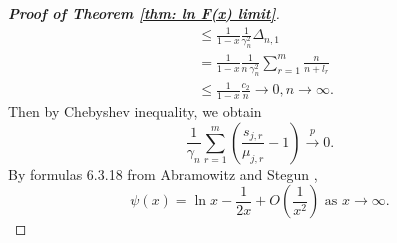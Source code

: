 \documentclass[12pt]{article}
\theoremstyle{plain}
\theoremstyle{definition}
\theoremstyle{remark}
\begin{document}
\begin{proof}[\textit{\textbf{Proof of Theorem \ref{thm: ln F(x) limit}}}]
\begin{equation*}
\begin{aligned}
			&\leq\frac{1}{1-x}\frac{1}{\gamma_{n}^2}\Delta_{n, 1}\\
			&=\frac{1}{1-x}\frac{1}{n\  \gamma_{n}^2}\sum_{r=1}^{m}\frac{n}{n+l_r}\\
			&\leq\frac{1}{1-x}\frac{c_2}{n }\to 0, n\to \infty.
		\end{aligned}
	\end{equation*}
	Then by Chebyshev inequality, we obtain
	\begin{equation}\label{term1}
	\frac{1}{\gamma_n}\sum_{r=1}^{m}\left(\frac{s_{j, r}}{\mu_{j, r}}-1\right) \stackrel{p}{\rightarrow} 0.
	\end{equation}
By formulas 6.3.18 from Abramowitz and Stegun \cite{Handbook of Mathematical Functions},
\begin{equation*}
 \psi(x)=\ln x-\frac{1}{2 x}+O\left(\frac{1}{x^{2}}\right) \text{ as }x\to \infty. 
\end{equation*}


\end{proof}
\end{document}
